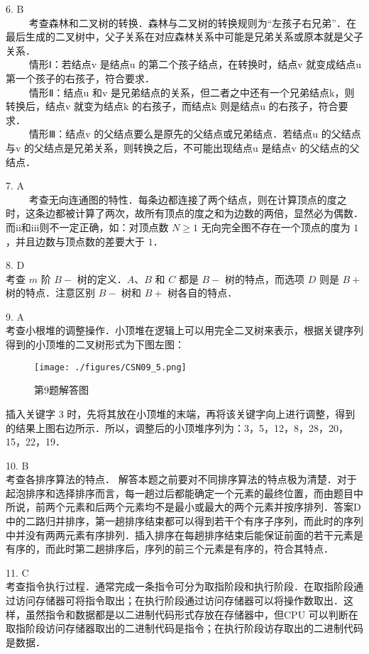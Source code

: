 6. B \\
$\qquad$ 考查森林和二叉树的转换．森林与二叉树的转换规则为“左孩子右兄弟”．在最后生成的二叉树中，父子关系在对应森林关系中可能是兄弟关系或原本就是父子关系． \\
$\qquad$ 情形Ⅰ：若结点v 是结点u 的第二个孩子结点，在转换时，结点v 就变成结点u 第一个孩子的右孩子，符合要求． \\
$\qquad$ 情形Ⅱ：结点u 和v 是兄弟结点的关系，但二者之中还有一个兄弟结点k，则转换后，结点v 就变为结点k 的右孩子，而结点k 则是结点u 的右孩子，符合要求． \\
$\qquad$ 情形Ⅲ：结点v 的父结点要么是原先的父结点或兄弟结点．若结点u 的父结点与v 的父结点是兄弟关系，则转换之后，不可能出现结点u 是结点v 的父结点的父结点．

7. A \\
$\qquad$ 考查无向连通图的特性．每条边都连接了两个结点，则在计算顶点的度之时，这条边都被计算了两次，故所有顶点的度之和为边数的两倍，显然必为偶数．而ii和iii则不一定正确，如：对顶点数 $N\geqslant1$ 无向完全图不存在一个顶点的度为 $1$，并且边数与顶点数的差要大于 $1$．

8. D \\
考查 $m$ 阶 $B-$ 树的定义．$A$、$B$ 和 $C$ 都是 $B-$ 树的特点，而选项 $D$ 则是 $B+$ 树的特点．注意区别 $B-$ 树和 $B+$ 树各自的特点．

9. A \\
考查小根堆的调整操作．小顶堆在逻辑上可以用完全二叉树来表示，根据关键序列得到的小顶堆的二叉树形式为下图左图：
\begin{figure}[ht]
\centering
\texttt{[image: ./figures/CSN09\_5.png]}
\caption{第9题解答图} \label{CSN09_fig5}
\end{figure}
插入关键字 3 时，先将其放在小顶堆的末端，再将该关键字向上进行调整，得到的结果上图右边所示．所以，调整后的小顶堆序列为：3，5，12，8，28，20，15，22，19．

10. B \\
考查各排序算法的特点．
解答本题之前要对不同排序算法的特点极为清楚．对于起泡排序和选择排序而言，每一趟过后都能确定一个元素的最终位置，而由题目中所说，前两个元素和后两个元素均不是最小或最大的两个元素并按序排列．答案D 中的二路归并排序，第一趟排序结束都可以得到若干个有序子序列，而此时的序列中并没有两两元素有序排列．插入排序在每趟排序结束后能保证前面的若干元素是有序的，而此时第二趟排序后，序列的前三个元素是有序的，符合其特点．

11. C \\
考查指令执行过程．通常完成一条指令可分为取指阶段和执行阶段．在取指阶段通过访问存储器可将指令取出；在执行阶段通过访问存储器可以将操作数取出．这样，虽然指令和数据都是以二进制代码形式存放在存储器中，但CPU 可以判断在取指阶段访问存储器取出的二进制代码是指令；在执行阶段访存取出的二进制代码是数据．

